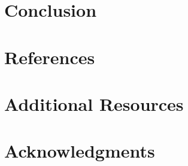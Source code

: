 \documentclass[a4paper, 10pt]{article}
\begin{document}
	\section{Conclusion}
	\section{References}
	\section{Additional Resources}
	\section{Acknowledgments}
\end{document}
